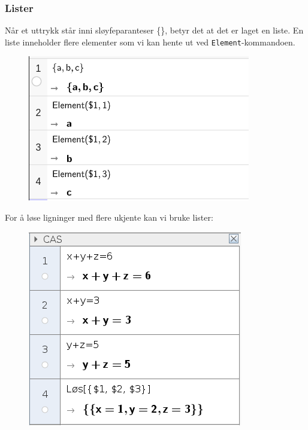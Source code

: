 \subsubsection{Lister}
Når et uttrykk står inni sløyfeparanteser \{\}, betyr det at det er laget en liste. En liste inneholder flere elementer som vi kan hente ut ved \texttt{Element}-kommandoen.
\begin{figure}
	\centering
	\includegraphics[scale=0.5]{fig/liste}
\end{figure}
For å løse ligninger med flere ukjente kan vi bruke lister:
\begin{figure}
	\centering
	\includegraphics[scale=0.5]{fig/lign}
\end{figure}
